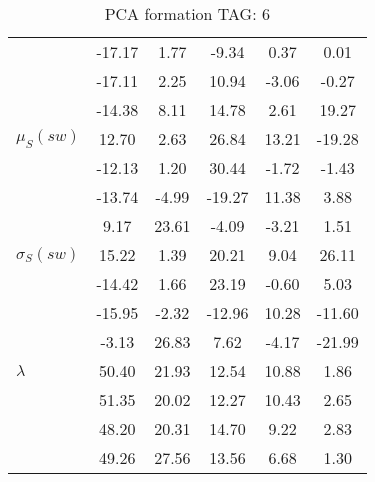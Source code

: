 \begin{table}[h!]
\begin{center}
\begin{tabular}{| l || c | c | c | c | c |}
 & -17.17  & 1.77  & -9.34  & 0.37  & 0.01 \\
 & -17.11  & 2.25  & 10.94  & -3.06  & -0.27 \\
 & -14.38  & 8.11  & 14.78  & 2.61  & 19.27 \\\hline
$\mu_S(sw)$ & 12.70  & 2.63  & 26.84  & 13.21  & -19.28 \\
 & -12.13  & 1.20  & 30.44  & -1.72  & -1.43 \\
 & -13.74  & -4.99  & -19.27  & 11.38  & 3.88 \\
 & 9.17  & 23.61  & -4.09  & -3.21  & 1.51 \\\hline
$\sigma_S(sw)$ & 15.22  & 1.39  & 20.21  & 9.04  & 26.11 \\
 & -14.42  & 1.66  & 23.19  & -0.60  & 5.03 \\
 & -15.95  & -2.32  & -12.96  & 10.28  & -11.60 \\
 & -3.13  & 26.83  & 7.62  & -4.17  & -21.99 \\\hline\hline
$\lambda$ & 50.40  & 21.93  & 12.54  & 10.88  & 1.86 \\
 & 51.35  & 20.02  & 12.27  & 10.43  & 2.65 \\
 & 48.20  & 20.31  & 14.70  & 9.22  & 2.83 \\
 & 49.26  & 27.56  & 13.56  & 6.68  & 1.30 \\\hline
\end{tabular}
\caption{PCA formation TAG: 6}
\end{center}
\end{table}